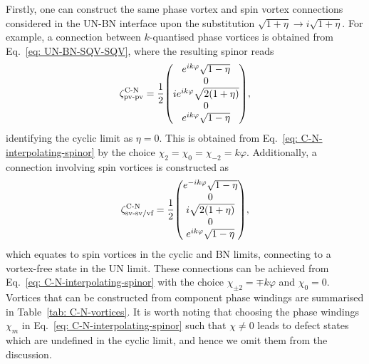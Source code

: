 Firstly, one can construct the same phase vortex and spin vortex connections
considered in the UN-BN interface upon the substitution \(\sqrt{1+\eta}
\rightarrow i\sqrt{1+\eta}\).
For example, a connection between \(k\)-quantised phase vortices is obtained
from Eq.~\eqref{eq: UN-BN-SQV-SQV}, where the resulting spinor reads
\begin{align}
    \zeta^\text{C-N}_\text{pv-pv} = \frac{1}{2}\mqty(
        e^{ik\varphi}\sqrt{1 - \eta} \\
        0 \\
        ie^{ik\varphi}\sqrt{2(1 + \eta)} \\
        0 \\
        e^{ik\varphi}\sqrt{1 - \eta}
    ),
\end{align}
identifying the cyclic limit as \(\eta = 0\).
This is obtained from Eq.~\eqref{eq: C-N-interpolating-spinor} by the choice
\(\chi_2=\chi_0=\chi_{-2}=k\varphi\).
Additionally, a connection involving spin vortices is constructed as
\begin{align}
    \zeta^\text{C-N}_\text{sv-sv/vf} = \frac{1}{2}\mqty(
        e^{-ik\varphi}\sqrt{1 - \eta} \\
        0 \\
        i\sqrt{2(1 + \eta)} \\
        0 \\
        e^{ik\varphi}\sqrt{1 - \eta}
    ),
\end{align}
which equates to spin vortices in the cyclic and BN limits, connecting to a
vortex-free state in the UN limit.
These connections can be achieved from Eq.~\eqref{eq: C-N-interpolating-spinor}
with the choice \(\chi_{\pm 2} = \mp k\varphi\) and \(\chi_0=0\).
Vortices that can be constructed from component phase windings are summarised in
Table~\ref{tab: C-N-vortices}.
It is worth noting that choosing the phase windings \(\chi_m\) in
Eq.~\eqref{eq: C-N-interpolating-spinor} such that \(\chi \neq 0\) leads
to defect states which are undefined in the cyclic limit, and hence we omit
them from the discussion.
